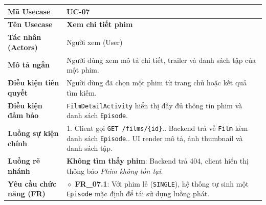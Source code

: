 \begin{table}[H]
\renewcommand{\arraystretch}{1.3}
\centering
\begin{tabularx}{\textwidth}{|p{4.5cm}|X|}
\hline
\cellcolor{gray!15}\bfseries Mã Usecase & \textbf{UC-07} \\ \hline
\cellcolor{gray!15}\bfseries Tên Usecase & \textbf{Xem chi tiết phim} \\ \hline
\cellcolor{gray!15}\bfseries Tác nhân (Actors) & Người xem (User) \\ \hline
\cellcolor{gray!15}\bfseries Mô tả ngắn & Người dùng xem mô tả chi tiết, trailer và danh sách tập của một phim. \\ \hline
\cellcolor{gray!15}\bfseries Điều kiện tiên quyết & Người dùng đã chọn một phim từ trang chủ hoặc kết quả tìm kiếm. \\ \hline
\cellcolor{gray!15}\bfseries Điều kiện đảm bảo & \texttt{FilmDetailActivity} hiển thị đầy đủ thông tin phim và danh sách \texttt{Episode}. \\ \hline
\cellcolor{gray!15}\bfseries Luồng sự kiện chính & 1. Client gọi \texttt{GET /films/\{id\}}.\newline 2. Backend trả về \texttt{Film} kèm danh sách \texttt{Episode}.\newline 3. UI render mô tả, ảnh thumbnail và danh sách tập. \\ \hline
\cellcolor{gray!15}\bfseries Luồng rẽ nhánh & \textbf{Không tìm thấy phim}: Backend trả 404, client hiển thị thông báo \textit{Phim không tồn tại}. \\ \hline
\cellcolor{gray!15}\bfseries Yêu cầu chức năng (FR) & $\diamond$ \textbf{FR\_07.1}: Với phim lẻ (\texttt{SINGLE}), hệ thống tự sinh một \texttt{Episode} mặc định để tái sử dụng luồng phát. \\ \hline
\end{tabularx}
\end{table}

